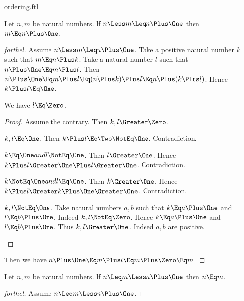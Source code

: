 \documentclass{stex}
\begin{document}
\begin{smodule}{ordering.ftl}
\begin{proposition*}[forthel]
  Let $n, m$ be natural numbers.
  If $n \Less m \Leq n \Plus \One$ then $m \Eq n \Plus \One$.
\end{proposition*}
\begin{proof}[forthel]
  Assume $n \Less m \Leq n \Plus \One$.
  Take a positive natural number $k$ such that $m \Eq n \Plus k$.
  Take a natural number $l$ such that $n \Plus \One \Eq m \Plus l$.
  Then $n \Plus \One
    \Eq m \Plus l
    \Eq (n \Plus k) \Plus l
    \Eq n \Plus (k \Plus l)$.
  Hence $k \Plus l \Eq \One$.

  We have $l \Eq \Zero$.
  \begin{proof}
    Assume the contrary.
    Then $k,l \Greater \Zero$.

    \begin{case}{$k,l \Eq \One$.}
      Then $k \Plus l
        \Eq \Two
        \NotEq \One$.
      Contradiction.
    \end{case}

    \begin{case}{$k \Eq \One and l \NotEq \One$.}
      Then $l \Greater \One$.
      Hence $k \Plus l
        \Greater \One \Plus l
        \Greater \One$.
      Contradiction.
    \end{case}

    \begin{case}{$k \NotEq \One and l \Eq \One$.}
      Then $k \Greater \One$.
      Hence $k \Plus l
        \Greater k \Plus \One
        \Greater \One$.
      Contradiction.
    \end{case}

    \begin{case}{$k, l \NotEq \One$.}
      Take natural numbers $a, b$ such that $k \Eq a \Plus \One$ and $l \Eq b \Plus \One$.
      Indeed $k, l \NotEq \Zero$.
      Hence $k \Eq a \Plus \One$ and $l \Eq b \Plus \One$.
      Thus $k, l \Greater \One$. Indeed $a, b$ are positive.
    \end{case}
  \end{proof}

  Then we have $n \Plus \One
    \Eq m \Plus l
    \Eq m \Plus \Zero
    \Eq m$.
\end{proof}

\begin{proposition*}[forthel]
  Let $n, m$ be natural numbers.
  If $n \Leq m \Less n \Plus \One$ then $n \Eq m$.
\end{proposition*}
\begin{proof}[forthel]
  Assume $n \Leq m \Less n \Plus \One$.


\end{proof}
\end{smodule}
\end{document}
